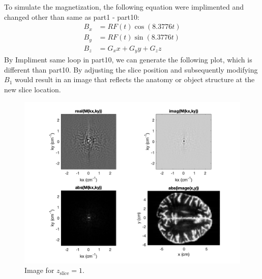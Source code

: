 \documentclass{report}
\begin{document}
To simulate the magnetization, the following equation were implimented and changed other than same as part1 - part10:
\begin{align*}
    B_x &= RF(t) \cos(8.3776 t)\\
    B_y &= RF(t) \sin(8.3776 t)\\
    B_z &= G_{x} x + G_{y} y + G_{z} z
\end{align*}
By Impliment same loop in part10, we can generate the following plot, which is different than part10.
By adjusting the slice position and subsequently modifying $B_1$ would result in an image that reflects 
the anatomy or object structure at the new slice location.
\begin{figure}[hb]
    \centering
    \includegraphics[width=1\textwidth]{12.png}
    \caption{Image for $z_{\text{slice}} = 1$.}
\end{figure}
\newpage 
\end{document}
